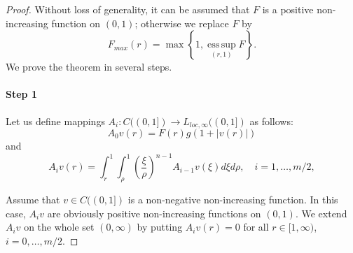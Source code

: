 \documentclass[11pt]{amsart}
\theoremstyle{definition}
\numberwithin{equation}{section}
\begin{document}
\begin{proof}
Without loss of generality, it can be assumed that $F$ is a positive non-increasing function on $(0, 1)$; otherwise we replace $F$ by 
$$
	F_{max} (r)
	=
	\max
	\left\{ 
		1,
		\operatorname*{ess\,sup}_{(r, 1)}
		F
	\right\}.
$$
We prove the theorem in several steps.
\paragraph{Step 1} 
Let us define mappings $A_i : C ((0, 1]) \to L_{loc, \infty} ((0, 1])$ as follows:
$$
	A_0 v (r) = F (r) g (1 +|v (r)|)
$$
and
$$
	A_i v (r)
	=
	\int_r^1
	\int_\rho^1
	\left(
		\frac{\xi}{\rho}
	\right)^{n - 1}
	A_{i - 1} v (\xi)
	d\xi
	d\rho,
	\quad
	i = 1, \ldots, m / 2,
$$

Assume that $v \in C ((0, 1])$ is a non-negative non-increasing function.
In this case, $A_i v$ are obviously positive non-increasing functions on $(0, 1)$.
We extend $A_i v$ on the whole set $(0, \infty)$ by putting $A_i v (r) = 0$ for all $r \in [1, \infty)$, $i = 0, \ldots, m / 2$.


\end{proof}
\end{document}
